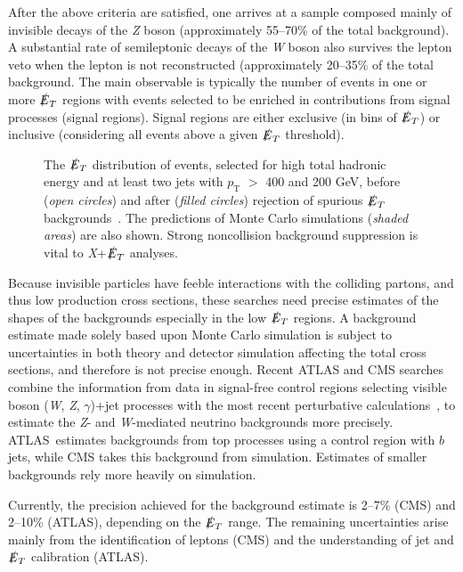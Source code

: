 \documentclass{ar-1col}
\newcommand{\IP}{invisible particle}
\newcommand{\pt}{\ensuremath{p_\mathrm{T}}\xspace}
\newcommand{\MET}{\ensuremath{\slashed{E}_T}\xspace}
\begin{document}
After the above criteria are satisfied, one arrives at a sample composed mainly
of invisible decays of the \textit{Z} boson (approximately 55--70\% of the
total background). A substantial rate of semileptonic decays of
the \textit{W} boson also survives the lepton veto when the lepton is not
reconstructed (approximately 20--35\% of the total background.
The main observable is typically the number of events in one or
more \MET regions with events selected to be enriched in contributions from signal processes (signal regions). 
Signal regions are either exclusive (in bins of
\MET) or inclusive (considering all events above a given \MET
threshold).

\begin{figure}[!htpb]
\caption{The \MET distribution of events, selected for high total
hadronic energy and at least two jets with \pt{} $>$ 400 and 200
GeV, before (\textit{open circles}) and after (\textit{filled circles}) rejection of
spurious \MET backgrounds~\cite{CMS-PAS-JME-16-004}. The
predictions of Monte Carlo  simulations (\textit{shaded areas}) are also shown. Strong
noncollision background suppression is vital to \textit{X}+\MET analyses.}
\label{fig:fakeMET}
\end{figure}

Because {\IP}s have feeble interactions with the colliding
partons, and thus low production cross sections, these searches
need precise estimates of the shapes of the backgrounds especially in the low \MET regions.
A background estimate made solely based upon Monte Carlo simulation is subject to
uncertainties in both theory and detector simulation affecting the
total cross sections, and therefore is not precise enough. 
Recent ATLAS and CMS searches combine the information from data in signal-free
{control regions} selecting visible boson (\textit{W},
\textit{Z}, $\gamma$)+jet processes with the most recent perturbative
calculations~\cite{Lindert:2017olm}, to
estimate the \textit{Z}- and \textit{W}-mediated neutrino backgrounds more precisely.
ATLAS\ estimates backgrounds from top processes using a
control region with $b$ jets, while CMS takes this background from
simulation. Estimates of smaller backgrounds rely more heavily on
simulation.

Currently, the precision achieved for the background estimate is 2--7\%
(CMS) and 2--10\% (ATLAS), depending on the \MET range. The
remaining uncertainties arise mainly from the identification of
leptons (CMS) and the understanding of jet and \MET
calibration (ATLAS).
\end{document}
